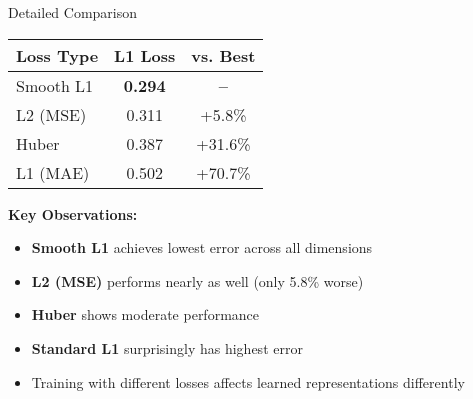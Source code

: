\documentclass[aspectratio=169]{beamer}
\begin{document}
\begin{frame}{Detailed Comparison}
\begin{table}
\centering
\large
\begin{tabular}{lcc}
\toprule
\textbf{Loss Type} & \textbf{L1 Loss} & \textbf{vs. Best} \\
\midrule
\rowcolor{green!20}
Smooth L1 & \textbf{0.294} & \textbf{--} \\
L2 (MSE) & 0.311 & +5.8\% \\
Huber & 0.387 & +31.6\% \\
L1 (MAE) & 0.502 & +70.7\% \\
\bottomrule
\end{tabular}
\end{table}

\vspace{0.5cm}
\textbf{Key Observations:}
\begin{itemize}
    \item \textbf{Smooth L1} achieves lowest error across all dimensions
    \item \textbf{L2 (MSE)} performs nearly as well (only 5.8\% worse)
    \item \textbf{Huber} shows moderate performance
    \item \textbf{Standard L1} surprisingly has highest error
    \item Training with different losses affects learned representations differently
\end{itemize}
\end{frame}
\end{document}
